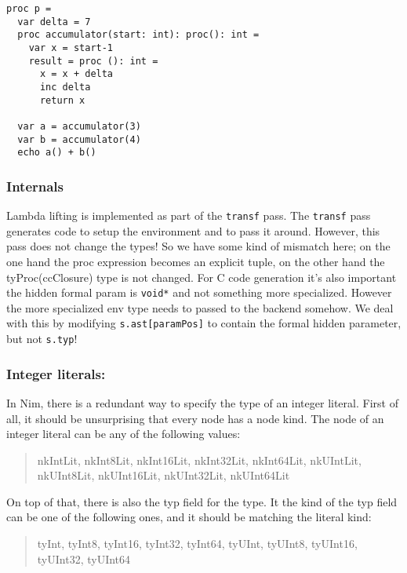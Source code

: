 \begin{verbatim}
proc p =
  var delta = 7
  proc accumulator(start: int): proc(): int =
    var x = start-1
    result = proc (): int =
      x = x + delta
      inc delta
      return x

  var a = accumulator(3)
  var b = accumulator(4)
  echo a() + b()
\end{verbatim}

\hypertarget{internals}{%
\subsubsection{Internals}\label{internals}}

Lambda lifting is implemented as part of the \texttt{transf} pass. The
\texttt{transf} pass generates code to setup the environment and to pass
it around. However, this pass does not change the types! So we have some
kind of mismatch here; on the one hand the proc expression becomes an
explicit tuple, on the other hand the tyProc(ccClosure) type is not
changed. For C code generation it's also important the hidden formal
param is \texttt{void*} and not something more specialized. However the
more specialized env type needs to passed to the backend somehow. We
deal with this by modifying \texttt{s.ast{[}paramPos{]}} to contain the
formal hidden parameter, but not \texttt{s.typ}!

\hypertarget{integer-literals}{%
\subsubsection{Integer literals:}\label{integer-literals}}

In Nim, there is a redundant way to specify the type of an integer
literal. First of all, it should be unsurprising that every node has a
node kind. The node of an integer literal can be any of the following
values:

\begin{quote}
nkIntLit, nkInt8Lit, nkInt16Lit, nkInt32Lit, nkInt64Lit, nkUIntLit,
nkUInt8Lit, nkUInt16Lit, nkUInt32Lit, nkUInt64Lit
\end{quote}

On top of that, there is also the {typ} field for the type. It the kind
of the {typ} field can be one of the following ones, and it should be
matching the literal kind:

\begin{quote}
tyInt, tyInt8, tyInt16, tyInt32, tyInt64, tyUInt, tyUInt8, tyUInt16,
tyUInt32, tyUInt64
\end{quote}

